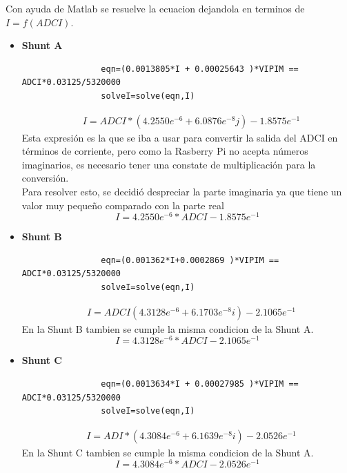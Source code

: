         Con ayuda de Matlab se resuelve la ecuacion dejandola en terminos de $I = f(ADCI) $.
        \begin{itemize}
            \item \textbf{Shunt A} 
                \begin{lstlisting}
                eqn=(0.0013805*I + 0.00025643 )*VIPIM == ADCI*0.03125/5320000
                solveI=solve(eqn,I)
                \end{lstlisting}
                \begin{align*}
                    &I = ADCI*( 4.2550e^{ -6}  + 6.0876e^{ -8 }j ) - 1.8575e^{ -1 }
                \end{align*}
                Esta expresión es la que se iba a usar para convertir la salida del ADCI en términos de corriente, pero como la Rasberry Pi no acepta números imaginarios, es necesario tener una constate de multiplicación para la conversión.
                \\
                Para resolver esto, se decidió despreciar la parte imaginaria ya que tiene un valor muy pequeño comparado con la parte real
                \begin{equation}\label{Cnt conversion ShuntA}
                    I = 4.2550e^{ -6 }*ADCI - 1.8575e^{ -1 }
                \end{equation}
            \item \textbf{Shunt B} 
                \begin{lstlisting}
                eqn=(0.001362*I+0.0002869 )*VIPIM == ADCI*0.03125/5320000
                solveI=solve(eqn,I)
                \end{lstlisting}
                \begin{align*}
                    &I = ADCI( 4.3128e^{ -6 } + 6.1703e^{ -8 }i ) - 2.1065e^{ -1 }
                \end{align*}
                En la Shunt B tambien se cumple la misma condicion de la Shunt A. 
                \begin{equation}\label{Cnt conversion ShuntB}
                    I = 4.3128e^{ -6 }*ADCI - 2.1065e^{ -1 }
                \end{equation}
            \item \textbf{Shunt C} 
                \begin{lstlisting}
                eqn=(0.0013634*I + 0.00027985 )*VIPIM == ADCI*0.03125/5320000
                solveI=solve(eqn,I)
                \end{lstlisting}
                \begin{align*}
                    &I = ADI*( 4.3084e^{ -6 } + 6.1639e^{ -8} i ) - 2.0526e^{ -1 }
                \end{align*}
                En la Shunt C tambien se cumple la misma condicion de la Shunt A. 
                \begin{equation}\label{Cnt conversion ShuntC}
                    I = 4.3084e^{ -6 }*ADCI - 2.0526e^{ -1 }
                \end{equation}
        \end{itemize}


        